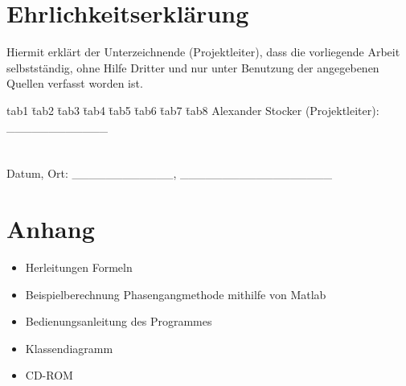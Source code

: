 \documentclass{fhnwreport}
\begin{document}
\section{Ehrlichkeitserklärung}
Hiermit erklärt der Unterzeichnende (Projektleiter), dass die vorliegende Arbeit selbstständig, ohne Hilfe Dritter und nur unter Benutzung der angegebenen Quellen verfasst worden ist.\newline
\\

\begin{tabbing}
tab1 \= tab2 \= tab3 \= tab4 \= tab5 \=tab6 \= tab7 \= tab8 \kill
Alexander Stocker (Projektleiter): \>\>\>\>\>\>\>\_\_\_\_\_\_\_\_\_\_\_\_\\
\\
\\
Datum, Ort: \>\>\>\>\>\>\>\_\_\_\_\_\_\_\_\_\_\_\_, \_\_\_\_\_\_\_\_\_\_\_\_\_\_\_\_\_\_\\
\end{tabbing}



\newpage

\listoffigures
\listoftables


\newpage
\section{Anhang}
\begin{itemize}
\item Herleitungen Formeln
\item Beispielberechnung Phasengangmethode mithilfe von Matlab
\item Bedienungsanleitung des Programmes 
\item Klassendiagramm
\item CD-ROM

\end{itemize}


 
\end{document}
